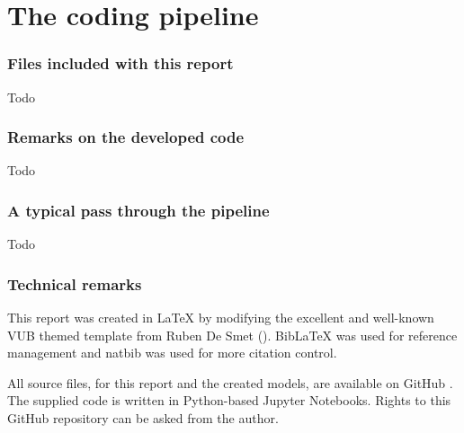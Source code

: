 \part{The coding pipeline}
\label{part:pipeline}


\section{Files included with this report}
\label{section:inc_files}
Todo

\section{Remarks on the developed code}
\label{section:ideology_dev_code}
Todo

\section{A typical pass through the pipeline}
\label{section:typical_pass_through_pipeline}
Todo


\section{Technical remarks}
\label{section:technical_remarks}

This report was created in \LaTeX{} by modifying the excellent and well-known VUB themed template from Ruben De Smet (\citeyear{latex_template}). BibLaTeX was used for reference management and natbib was used for more citation control. 

All source files, for this report and the created models, are available on GitHub \citep{github_project}. The supplied code is written in Python-based Jupyter Notebooks. Rights to this GitHub repository can be asked from the author.